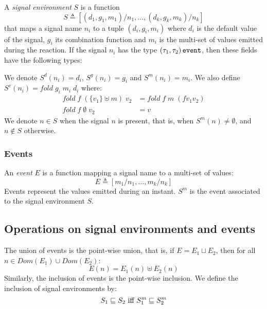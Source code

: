 \documentclass[9pt,preprint]{sigplanconf}
\newcommand{\deq}{\triangleq}
\begin{document}
 A \emph{signal environment} $S$ is a function
\[ S \deq [ (d_1, g_1, m_1)/n_1, \dots, (d_k, g_k, m_k)/n_k ] \] 
that maps a signal name $n_i$ to a tuple $(d_i, g_i, m_i)$ where $d_i$ is the default value of the signal, $g_i$ its combination function and $m_i$ is the multi-set of values emitted during the reaction. If the signal $n_i$ has the type $(\tau_1, \tau_2) \,\mathtt{event}$, then these fields have the following types:
We denote $S^d(n_i) = d_i$, $S^g(n_i) = g_i$ and $S^m(n_i) = m_i$. We also define $S^v(n_i) = \mathit{fold}\; g_i\; m_i\; d_i$ where:
\begin{align*}
\mathit{fold}\; f\; (\{ v_1 \} \uplus m)\; v_2 &= \mathit{fold}\; f\; m\; (f v_1 v_2) \\
\mathit{fold}\; f\; \emptyset\; v_2 &= v
\end{align*}
We denote $n \in S$ when the signal $n$ is present, that is, when $S^m(n) \neq \emptyset$, and $n \not\in S$ otherwise.

\subsubsection*{Events}

An \emph{event} $E$ is a function mapping a signal name to a multi-set of values:
\[ E \deq [ m_1/n_1, \dots, m_k/n_k] \]
Events represent the values emitted during an instant. $S^m$ is the event associated to the signal environment $S$.

\subsection*{Operations on signal environments and events}

The union of events is the point-wise union, that is, if $E = E_1 \sqcup E_2$, then for all  $n \in \mathit{Dom}(E_1) \cup \mathit{Dom}(E_2)$: 
\[ E(n) = E_1(n) \uplus E_2(n) \]
Similarly, the inclusion of events is the point-wise inclusion. We define the inclusion of signal environments by:
\[ S_1 \sqsubseteq S_2 \text{ iff } S^m_1 \sqsubseteq S^m_2 \\ \]
\end{document}
